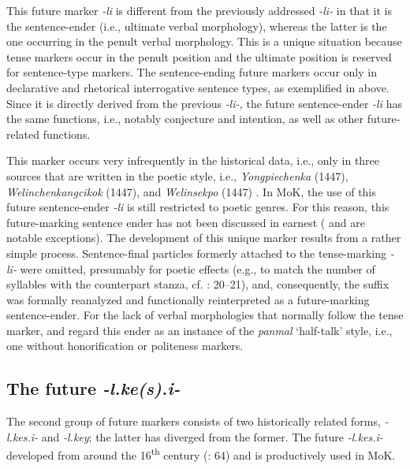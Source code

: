 \documentclass[output=paper,colorlinks,citecolor=brown]{langscibook}
\begin{document}
This future marker \textit{-li} is different from the previously addressed \textit{-li-} in that it is the sentence-ender (i.e., ultimate verbal morphology), whereas the latter is the one occurring in the penult verbal morphology. This is a unique situation because tense markers occur in the penult position and the ultimate position is reserved for sentence-type markers. The sentence-ending future markers occur only in declarative and rhetorical interrogative sentence types, as exemplified in  above. Since it is directly derived from the previous \textit{-li-,} the future sentence-ender \textit{-li} has the same functions, i.e., notably conjecture and intention, as well as other future-related functions.

This marker occurs very infrequently in the historical data, i.e., only in three sources that are written in the poetic style, i.e., \textit{Yongpiechenka} (1447), \textit{Welinchenkangcikok} (1447), and \textit{Welinsekpo} (1447) \citep[][20]{yeom1998sententialendings}. In MoK, the use of this future sentence-ender \textit{-li} is still restricted to poetic genres. For this reason, this future-marking sentence ender has not been discussed in earnest (\cite{Ko1990} and \cite{yeom1998sententialendings} are notable exceptions). The development of this unique marker results from a rather simple process. Sentence-final particles formerly attached to the tense-marking \textit{-li-} were omitted, presumably for poetic effects (e.g., to match the number of syllables with the counterpart stanza, cf. \cite{yeom1998sententialendings}:  20--21), and, consequently, the suffix was formally reanalyzed and functionally reinterpreted as a future-marking sentence-ender. For the lack of verbal morphologies that normally follow the tense marker, \citet[265]{Ko1990} and \citet[422]{Ryu1992} regard this ender as an instance of the \textit{panmal} ‘half-talk’ style, i.e., one without honorification or politeness markers. 


\subsection{The future \textit{-l.ke(s).i-}} \label{sec:2.2}
The second group of future markers consists of two historically related forms, \textit{-l.kes.i-} and \textit{-l.key}; the latter has diverged from the former. The future \textit{-l.kes.i-} developed from around the 16\textsuperscript{th} century (\cite{Lee1997}: 64) and is productively used in MoK.
\end{document}
